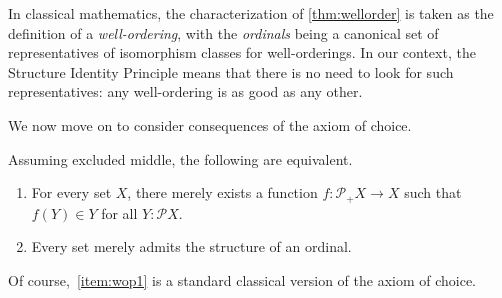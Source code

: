 In classical mathematics, the characterization of \autoref{thm:wellorder} is taken as the definition of a \emph{well-ordering}, with the \emph{ordinals} being a canonical set of representatives of isomorphism classes for well-orderings.
In our context, the Structure Identity Principle means that there is no need to look for such representatives: any well-ordering is as good as any other.

We now move on to consider consequences of the axiom of choice.

\begin{thm}\label{thm:wop}
  Assuming excluded middle, the following are equivalent.
  \begin{enumerate}
  \item For every set $X$, there merely exists a function
    $ f: \mathcal{P}_+X \to X $
    such that $f(Y)\in Y$ for all $Y:\mathcal{P}X$.\label{item:wop1}
  \item Every set merely admits the structure of an ordinal.\label{item:wop2}
  \end{enumerate}
\end{thm}

Of course,~\ref{item:wop1} is a standard classical version of the axiom of choice.

